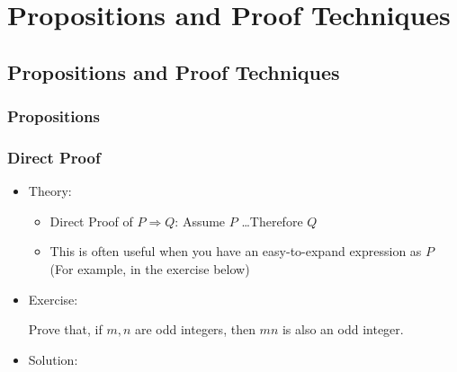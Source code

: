 \documentclass[9pt]{beamer}
\title{\themidterm}
\author{\theauthors}
\institute{\theorganization}
\date{\thedate}
\begin{document}

\begin{frame}[fragile]
  \titlepage
\end{frame}


\section{Propositions and Proof Techniques}
\subsection{Propositions and Proof Techniques}


\begin{frame}[fragile]
  \frametitle{Propositions}



\end{frame}

\begin{frame}[fragile]
  \frametitle{Direct Proof}
     \begin{itemize}
        \item Theory:
        \begin{itemize}
            \item Direct Proof of $P \Rightarrow Q$: Assume $P$ \dots Therefore $Q$
            \item This is often useful when you have an easy-to-expand expression as $P$ (For example, in the exercise below)
        \end{itemize}
        \item Exercise:

            Prove that, if $m, n$ are odd integers, then $mn$ is also an odd integer.
            
       \item Solution:
    \end{itemize}   



 
\end{frame}
\end{document}

